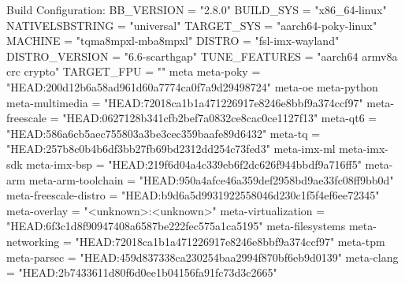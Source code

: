 \begtt
Build Configuration:
BB_VERSION           = "2.8.0"
BUILD_SYS            = "x86_64-linux"
NATIVELSBSTRING      = "universal"
TARGET_SYS           = "aarch64-poky-linux"
MACHINE              = "tqma8mpxl-mba8mpxl"
DISTRO               = "fsl-imx-wayland"
DISTRO_VERSION       = "6.6-scarthgap"
TUNE_FEATURES        = "aarch64 armv8a crc crypto"
TARGET_FPU           = ""
meta
meta-poky            = "HEAD:200d12b6a58ad961d60a7774ca0f7a9d29498724"
meta-oe
meta-python
meta-multimedia      = "HEAD:72018ca1b1a471226917e8246e8bbf9a374ccf97"
meta-freescale       = "HEAD:0627128b341cfb2bef7a0832ce8cac0ce1127f13"
meta-qt6             = "HEAD:586a6cb5aec755803a3be3cec359baafe89d6432"
meta-tq              = "HEAD:257b8c0b4b6df3bb27fb69bd2312dd254c73fed3"
meta-imx-ml
meta-imx-sdk
meta-imx-bsp         = "HEAD:219f6d04a4c339eb6f2dc626f944bbdf9a716ff5"
meta-arm
meta-arm-toolchain   = "HEAD:950a4afce46a359def2958bd9ae33fc08ff9bb0d"
meta-freescale-distro = "HEAD:b9d6a5d9931922558046d230c1f5f4ef6ee72345"
meta-overlay         = "<unknown>:<unknown>"
meta-virtualization  = "HEAD:6f3c1d8f90947408a6587be222fec575a1ca5195"
meta-filesystems
meta-networking      = "HEAD:72018ca1b1a471226917e8246e8bbf9a374ccf97"
meta-tpm
meta-parsec          = "HEAD:459d837338ca230254baa2994f870bf6eb9d0139"
meta-clang           = "HEAD:2b7433611d80f6d0ee1b04156fa91fc73d3c2665"
\endtt

\bye
